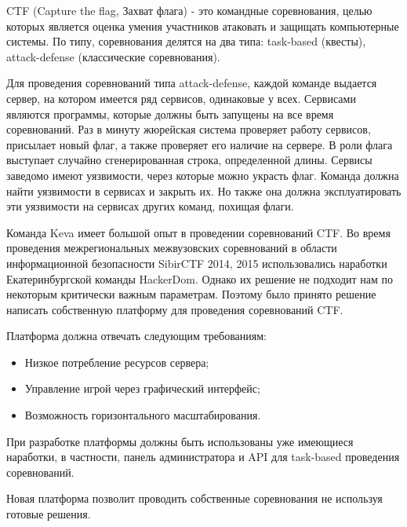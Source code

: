 CTF (Capture the flag, Захват флага) - это командные соревнования, целью которых является оценка умения участников атаковать и защищать компьютерные системы. По типу, соревнования делятся на два типа: task-based (квесты), attack-defense (классические соревнования).

Для проведения соревнований типа attack-defense, каждой команде выдается сервер, на котором имеется ряд сервисов, одинаковые у всех. Сервисами являются программы, которые должны быть запущены на все время соревнований. Раз в минуту жюрейская система проверяет работу сервисов, присылает новый флаг, а также проверяет его наличие на сервере. В роли флага выступает случайно сгенерированная строка, определенной длины. Сервисы заведомо имеют уязвимости, через которые можно украсть флаг. Команда должна найти уязвимости в сервисах и закрыть их. Но также она должна эксплуатировать эти уязвимости на сервисах других команд, похищая флаги. 

Команда Keva имеет большой опыт в проведении соревнований CTF. Во время проведения межрегиональных межвузовских соревнований в области информационной безопасности SibirCTF 2014, 2015 использовались наработки Екатеринбургской команды HackerDom. Однако их решение не подходит нам по некоторым критически важным параметрам. Поэтому  было принято решение написать собственную платформу для проведения соревнований CTF.

Платформа должна отвечать следующим требованиям:
\begin{itemize}
\item Низкое потребление ресурсов сервера;
\item Управление игрой через графический интерфейс;
\item Возможность горизонтального масштабирования.
\end{itemize}

При разработке платформы должны быть использованы уже имеющиеся наработки, в частности, панель администратора и API для task-based проведения соревнований. 

Новая платформа позволит проводить собственные соревнования не используя готовые решения.

